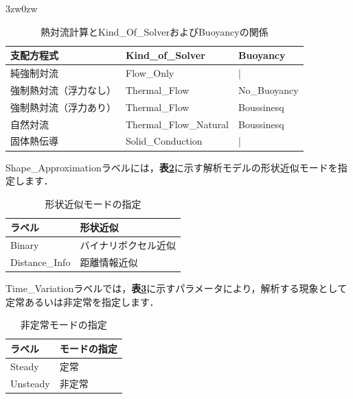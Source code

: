 \begin{indentation}{3zw}{0zw}
\begin{table}[htdp]
\caption{熱対流計算とKind\_Of\_SolverおよびBuoyancyの関係}
\begin{center}
\small
\begin{tabular}{lll} \toprule
支配方程式 & Kind\_of\_Solver & Buoyancy\\ \midrule
純強制対流 & Flow\_Only & |\\
強制熱対流（浮力なし）& Thermal\_Flow & No\_Buoyancy\\
強制熱対流（浮力あり）& Thermal\_Flow & Boussinesq\\
自然対流 & Thermal\_Flow\_Natural & Boussinesq\\
固体熱伝導 & Solid\_Conduction & |\\ \bottomrule
\end{tabular}
\end{center}
\label{tbl:kos}
\end{table}

\pagebreak
Shape\_Approximationラベルには，\textbf{表\ref{tbl:ShapeApprox}}に示す解析モデルの形状近似モードを指定します．

\begin{table}[htdp]
\caption{形状近似モードの指定}
\begin{center}
\small
\begin{tabular}{ll} \toprule
ラベル & 形状近似\\ \midrule
Binary & バイナリボクセル近似\\
Distance\_Info & 距離情報近似\\ \bottomrule
\end{tabular}
\end{center}
\label{tbl:ShapeApprox}
\end{table}

Time\_Variationラベルでは，\textbf{表\ref{tbl:steady}}に示すパラメータにより，解析する現象として定常あるいは非定常を指定します．
\begin{table}[htdp]
\caption{非定常モードの指定}
\begin{center}
\small
\begin{tabular}{ll} \toprule
ラベル & モードの指定\\ \midrule
Steady & 定常\\
Unsteady & 非定常\\ \bottomrule
\end{tabular}
\end{center}
\label{tbl:steady}
\end{table}



\end{indentation}
